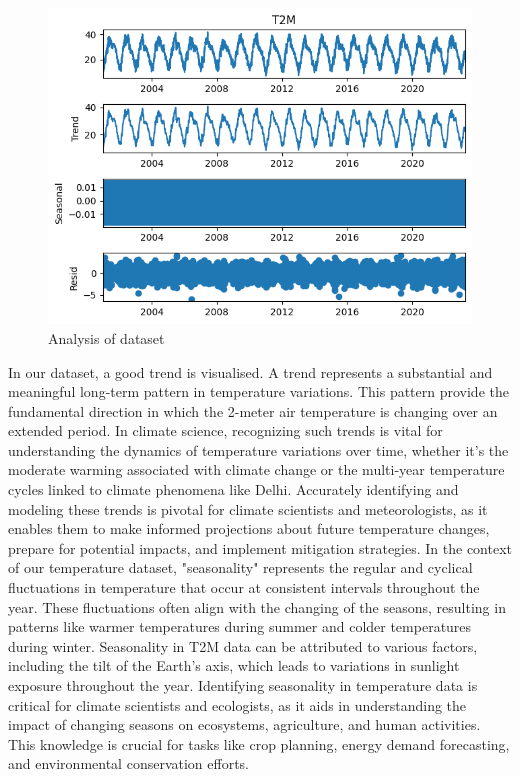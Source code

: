 \documentclass[sn-mathphys,Numbered]{sn-jnl}
\theoremstyle{thmstyleone}
\theoremstyle{thmstyletwo}
\theoremstyle{thmstylethree}
\begin{document}
  \begin{figure}[ht!]
    \centering
    \includegraphics[width=1\textwidth, height=0.9\linewidth]{Graphycal_EDA.png}
    \caption{Analysis of dataset }
    \label{fig:graphycalEDA}
\end{figure}
In our dataset, a good trend is visualised. A trend represents a substantial and meaningful long-term pattern in temperature variations. This pattern provide the fundamental direction in which the 2-meter air temperature is changing over an extended period. In climate science, recognizing such trends is vital for understanding the dynamics of temperature variations over time, whether it's the moderate warming associated with climate change or the multi-year temperature cycles linked to climate phenomena like Delhi. Accurately identifying and modeling these trends is pivotal for climate scientists and meteorologists, as it enables them to make informed projections about future temperature changes, prepare for potential impacts, and implement mitigation strategies.
In the context of our temperature dataset, "seasonality" represents the regular and cyclical fluctuations in temperature that occur at consistent intervals throughout the year. These fluctuations often align with the changing of the seasons, resulting in patterns like warmer temperatures during summer and colder temperatures during winter. Seasonality in T2M data can be attributed to various factors, including the tilt of the Earth's axis, which leads to variations in sunlight exposure throughout the year. Identifying seasonality in temperature data is critical for climate scientists and ecologists, as it aids in understanding the impact of changing seasons on ecosystems, agriculture, and human activities. This knowledge is crucial for tasks like crop planning, energy demand forecasting, and environmental conservation efforts.
\end{document}
